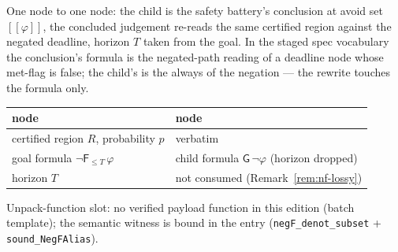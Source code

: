 

\begin{brecipe}\label{rec:nf-filled}
\begin{mathpar}
\end{mathpar}
One node to one node: the child is the safety battery's conclusion at
avoid set $[\![\varphi]\!]$, the concluded judgement re-reads the same
certified region against the negated deadline, horizon $T$ taken from
the goal. In the staged spec vocabulary the conclusion's formula is the
negated-path reading of a deadline node whose met-flag is false; the
child's is the always of the negation --- the rewrite touches the
formula only.
\end{brecipe}

\begin{brecipe}\label{rec:nf-transport}
\begin{center}\small
\begin{tabular}{@{}ll@{}}
\textbf{{NegFAlias} node} & \textbf{{QSafetyBattery} node}\\
\midrule
certified region $R$, probability $p$ & verbatim\\
goal formula $\neg\mathsf{F}_{\le T}\,\varphi$ & child formula $\mathsf{G}\,\neg\varphi$ (horizon dropped)\\
horizon $T$ & not consumed (Remark~\ref{rem:nf-lossy})\\
\end{tabular}
\end{center}
Unpack-function slot: no verified payload function in this edition (batch template); the
semantic witness is bound in the entry (\texttt{negF\_denot\_subset} +
\texttt{sound\_NegFAlias}).
\end{brecipe}

